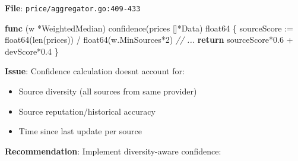 \documentclass[
]{article}
\newenvironment{Shaded}{}{}
\newcommand{\BuiltInTok}[1]{\textcolor[rgb]{0.00,0.50,0.00}{#1}}
\newcommand{\CommentTok}[1]{\textcolor[rgb]{0.38,0.63,0.69}{\textit{#1}}}
\newcommand{\ControlFlowTok}[1]{\textcolor[rgb]{0.00,0.44,0.13}{\textbf{#1}}}
\newcommand{\DataTypeTok}[1]{\textcolor[rgb]{0.56,0.13,0.00}{#1}}
\newcommand{\DecValTok}[1]{\textcolor[rgb]{0.25,0.63,0.44}{#1}}
\newcommand{\FloatTok}[1]{\textcolor[rgb]{0.25,0.63,0.44}{#1}}
\newcommand{\KeywordTok}[1]{\textcolor[rgb]{0.00,0.44,0.13}{\textbf{#1}}}
\newcommand{\NormalTok}[1]{#1}
\newcommand{\OperatorTok}[1]{\textcolor[rgb]{0.40,0.40,0.40}{#1}}
\providecommand{\tightlist}{%
  \setlength{\itemsep}{0pt}\setlength{\parskip}{0pt}}
\begin{document}
\textbf{File}: \texttt{price/aggregator.go:409-433}

\begin{Shaded}
\begin{Highlighting}[]
\KeywordTok{func} \OperatorTok{(}\NormalTok{w }\OperatorTok{*}\NormalTok{WeightedMedian}\OperatorTok{)}\NormalTok{ confidence}\OperatorTok{(}\NormalTok{prices }\OperatorTok{[]*}\NormalTok{Data}\OperatorTok{)} \DataTypeTok{float64} \OperatorTok{\{}
\NormalTok{    sourceScore }\OperatorTok{:=} \DataTypeTok{float64}\OperatorTok{(}\BuiltInTok{len}\OperatorTok{(}\NormalTok{prices}\OperatorTok{))} \OperatorTok{/} \DataTypeTok{float64}\OperatorTok{(}\NormalTok{w}\OperatorTok{.}\NormalTok{MinSources}\OperatorTok{*}\DecValTok{2}\OperatorTok{)}
    \CommentTok{// ...}
    \ControlFlowTok{return}\NormalTok{ sourceScore}\OperatorTok{*}\FloatTok{0.6} \OperatorTok{+}\NormalTok{ devScore}\OperatorTok{*}\FloatTok{0.4}
\OperatorTok{\}}
\end{Highlighting}
\end{Shaded}

\textbf{Issue}: Confidence calculation doesn\textquotesingle t account
for:

\begin{itemize}
\tightlist
\item
  Source diversity (all sources from same provider)
\item
  Source reputation/historical accuracy
\item
  Time since last update per source
\end{itemize}

\textbf{Recommendation}: Implement diversity-aware confidence:
\end{document}
